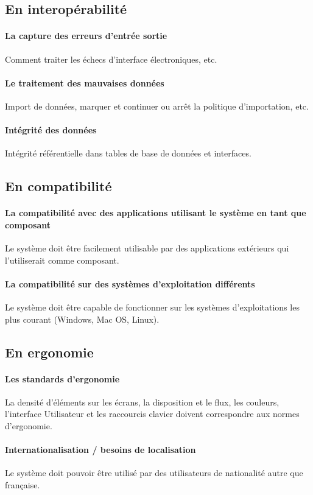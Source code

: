\documentclass[12pt,a4paper,openany]{report}
\begin{document}
		\subsection{En interopérabilité}
			\paragraph{La capture des erreurs d'entrée sortie} Comment traiter les échecs d'interface électroniques, etc.
			\paragraph{Le traitement des mauvaises données} Import de données, marquer et continuer ou arrêt la politique d'importation, etc.
			\paragraph{Intégrité des données} Intégrité référentielle dans tables de base de données et interfaces.
		\subsection{En compatibilité}
		\paragraph{La compatibilité avec des applications utilisant le système en tant que composant} Le système doit être facilement
		utilisable par des applications extérieurs qui l'utiliserait comme composant.
		\paragraph{La compatibilité sur des systèmes d'exploitation différents} Le système doit être capable de fonctionner sur les 
		systèmes d'exploitations les plus courant (Windows, Mac OS, Linux).
		\subsection{En ergonomie}
		\paragraph{Les standards d'ergonomie} La densité d'éléments sur les écrans, la disposition et le flux, les couleurs, l'interface 
		Utilisateur et les raccourcis clavier doivent correspondre aux normes d'ergonomie.
		\paragraph{Internationalisation / besoins de localisation} Le système doit pouvoir être utilisé par des utilisateurs de nationalité autre que française.
\end{document}
